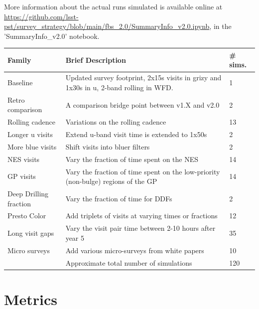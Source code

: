  More information about the actual runs simulated is available online at \url{https://github.com/lsst-pst/survey_strategy/blob/main/fbs_2.0/SummaryInfo_v2.0.ipynb}, in the 'SummaryInfo_v2.0' notebook. 
 
\vskip 0.4in


\begin{table}[]
\begin{tabular}{l | L | l}
Family               & Brief Description       &    \# sims.   \\
\hline\hline
Baseline            & Updated survey footprint, 2x15s visits in grizy and 1x30s in u, 2-band rolling in WFD. &   1     \\
Retro comparison     & A comparison bridge point between v1.X and v2.0  & 2 \\
Rolling cadence      & Variations on the rolling cadence   & 13  \\
Longer u visits  & Extend  u-band visit time is extended to 1x50s    &    2 \\
More blue visits & Shift visits into bluer filters & 2 \\
NES visits & Vary the fraction of time spent on the NES & 14 \\
GP visits & Vary the fraction of time spent on the low-priority (non-bulge) regions of the GP & 14 \\
Deep Drilling fraction & Vary the fraction of time for DDFs & 2 \\
Presto Color & Add triplets of visits at varying times or fractions  & 12 \\
Long visit gaps & Vary the visit pair time between 2-10 hours after year 5  &  35 \\
Micro surveys & Add various micro-surveys from white papers  & 10 \\
\hline
 & Approximate total number of simulations &  120 \\
\hline
\end{tabular}
\end{table}\label{tab:shortlist}


\section{Metrics}

